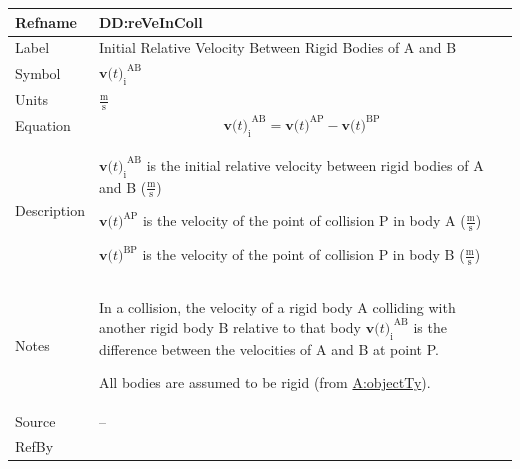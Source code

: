 \documentclass[12pt]{article}
\begin{document}
\medskip
\noindent
\begin{minipage}{\textwidth}
\begin{tabular}{>{\raggedright}p{}>{\raggedright\arraybackslash}p{}}
\toprule \textbf{Refname} & \textbf{DD:reVeInColl}
\label{DD:reVeInColl}
\\ \midrule
Label & Initial Relative Velocity Between Rigid Bodies of A and B
        
\\ \midrule
Symbol & ${{\symbf{v}\text{(}t\text{)}_{\text{i}}}^{\text{A}\text{B}}}$
         
\\ \midrule
Units & $\frac{\text{m}}{\text{s}}$
        
\\ \midrule
Equation & \begin{displaymath}
           {{\symbf{v}\text{(}t\text{)}_{\text{i}}}^{\text{A}\text{B}}}={\symbf{v}\text{(}t\text{)}^{\text{A}\text{P}}}-{\symbf{v}\text{(}t\text{)}^{\text{B}\text{P}}}
           \end{displaymath}
\\ \midrule
Description & \begin{symbDescription}
              \item{${{\symbf{v}\text{(}t\text{)}_{\text{i}}}^{\text{A}\text{B}}}$ is the initial relative velocity between rigid bodies of A and B ($\frac{\text{m}}{\text{s}}$)}
              \item{${\symbf{v}\text{(}t\text{)}^{\text{A}\text{P}}}$ is the velocity of the point of collision P in body A ($\frac{\text{m}}{\text{s}}$)}
              \item{${\symbf{v}\text{(}t\text{)}^{\text{B}\text{P}}}$ is the velocity of the point of collision P in body B ($\frac{\text{m}}{\text{s}}$)}
              \end{symbDescription}
\\ \midrule
Notes & In a collision, the velocity of a rigid body A colliding with another rigid body B relative to that body ${{\symbf{v}\text{(}t\text{)}_{\text{i}}}^{\text{A}\text{B}}}$ is the difference between the velocities of A and B at point P.
        
        All bodies are assumed to be rigid (from \hyperref[assumpOT]{A:objectTy}).
        
\\ \midrule
Source & --
         
\\ \midrule
RefBy & 
\\ \bottomrule
\end{tabular}
\end{minipage}
\end{document}
